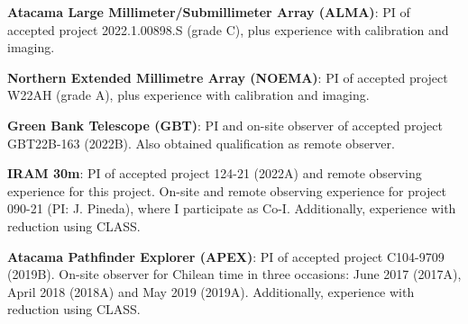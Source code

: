 \vspace{8pt}

\begin{cvitems} %
 \item {\textbf{Atacama Large Millimeter/Submillimeter Array (ALMA)}: PI of accepted project 2022.1.00898.S (grade C), plus experience with calibration and imaging.}
\item {\textbf{Northern Extended Millimetre Array (NOEMA)}: PI of accepted project W22AH (grade A), plus experience with calibration and imaging.}
\item {\textbf{Green Bank Telescope (GBT)}: PI and on-site observer of accepted project GBT22B-163 (2022B). Also obtained qualification as remote observer.}
\item {\textbf{IRAM 30m}: PI of accepted project 124-21 (2022A) and remote observing experience for this project. On-site and remote observing experience for project 090-21 (PI: J. Pineda), where I participate as Co-I. Additionally, experience with reduction using CLASS.}
\item {\textbf{Atacama Pathfinder Explorer (APEX)}: PI of accepted project C104-9709 (2019B). On-site observer for Chilean time in three occasions: June 2017 (2017A), April 2018 (2018A) and May 2019 (2019A). Additionally, experience with reduction using CLASS.}
\end{cvitems}